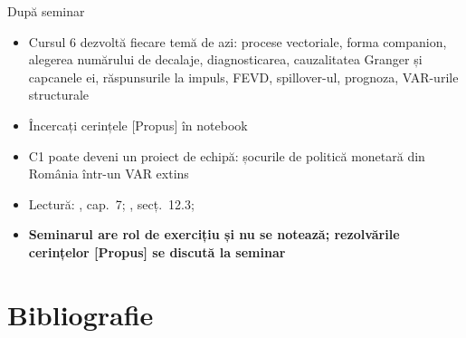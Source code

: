 \begin{frame}{După seminar}
\itemsize{\small}
\begin{itemize}
    \item Cursul 6 dezvoltă fiecare temă de azi: procese vectoriale, forma companion, alegerea numărului de decalaje, diagnosticarea, cauzalitatea Granger și capcanele ei, răspunsurile la impuls, FEVD, spillover-ul, prognoza, VAR-urile structurale
    \item Încercați cerințele [Propus] în notebook
    \item C1 poate deveni un proiect de echipă: șocurile de politică monetară din România într-un VAR extins
    \item Lectură: , cap.~7; , secț.~12.3; 
    \item \textbf{Seminarul are rol de exercițiu și nu se notează; rezolvările cerințelor [Propus] se discută la seminar}
\end{itemize}
\end{frame}


\section{Bibliografie}

